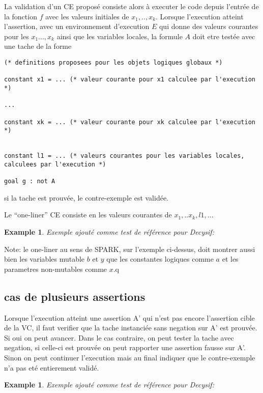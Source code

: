 \documentclass[a4paper,twoside]{article}
\newtheorem{example}[definition]{Example}
\begin{document}
La validation d'un CE proposé consiste alors à executer le code depuis l'entrée
de la fonction $f$ avec les valeurs initiales de $x_1,..,x_k$. Lorsque l'execution atteint l'assertion, avec un environnement d'execution $E$ qui donne des valeurs courantes pour les $x_1...,x_k$ ainsi que les variables locales, la formule $A$ doit etre testée avec une tache de la forme
\begin{lstlisting}
(* definitions proposees pour les objets logiques globaux *)

constant x1 = ... (* valeur courante pour x1 calculee par l'execution *)

...

constant xk = ... (* valeur courante pour xk calculee par l'execution *)


constant l1 = ... (* valeurs courantes pour les variables locales, calculees par l'execution *)

goal g : not A
\end{lstlisting}
si la tache est prouvée, le contre-exemple est validée.

Le ``one-liner'' CE consiste en les valeurs courantes de $x_1,..x_k,l1,...$



\begin{example}
Exemple ajouté comme test de référence pour Decysif:


\end{example}

Note: le one-liner au sens de SPARK, sur l'exemple ci-dessus, doit montrer aussi
bien les variables mutable $b$ et $y$ que les constantes logiques comme $a$ et
les parametres non-mutables comme $x$.q

\subsection{cas de plusieurs assertions}

Lorsque l'execution atteint une assertion A' qui n'est pas encore l'assertion
cible de la VC, il faut verifier que la tache instanciée sans negation sur A'
est prouvée. Si oui on peut avancer. Dans le cas contraire, on peut tester la
tache avec negation, si celle-ci est prouvée on peut rapporter une assertion
fausse sur A'. Sinon on peut continuer l'execution mais au final indiquer que le
contre-exemple n'a pas eté entierement validé.

\begin{example}
Exemple ajouté comme test de référence pour Decysif:


\end{example}
\end{document}
